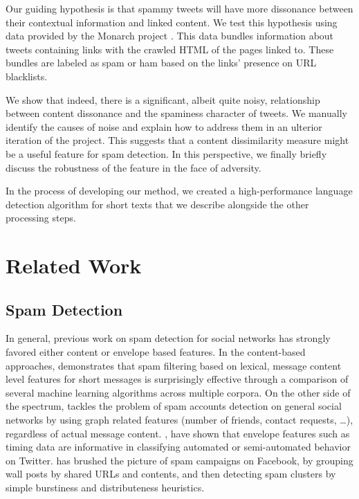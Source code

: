 \documentclass[times, 11pt, twocolumn]{article}
\begin{document}
Our guiding hypothesis is that spammy tweets will have more dissonance between their 
contextual information and linked content. We test this hypothesis using data provided by the 
Monarch project \cite{Thomas2011}. This data bundles information about tweets containing 
links with the crawled HTML of the pages linked to. These bundles are labeled as spam or 
ham based on the links' presence on URL blacklists.

We show that indeed, there is a significant, albeit quite noisy, relationship between content
dissonance and the spaminess character of tweets. We manually identify the causes of noise 
and explain how to address them in an ulterior iteration of the project. This suggests that
a content dissimilarity measure might be a useful feature for spam detection. In this perspective,
we finally briefly discuss the robustness of the feature in the face of adversity.

In the process of developing our method, we created a high-performance language detection 
algorithm for short texts that we describe alongside the other processing steps.

\section{Related Work}
\subsection{Spam Detection}
In general, previous work on spam detection for social networks has strongly favored 
either content or envelope based features. In the content-based approaches, \cite{Cormack2007} 
demonstrates that spam filtering based on lexical, message content level features 
for short messages is surprisingly effective through a comparison of several machine 
learning algorithms across multiple corpora. On the other side of the spectrum, \cite{Stringhini2010} 
tackles the problem of spam accounts detection on general social networks by using graph 
related features (number of friends, contact requests, \dots), regardless of actual 
message content. \cite{Zhang2011}, \cite{Ghosh2011} have shown that envelope features 
such as timing data are informative in classifying automated or semi-automated behavior 
on Twitter. \cite{Gao2010} has brushed the picture of spam campaigns on Facebook, by grouping 
wall posts by shared URLs and contents, and then detecting spam clusters by simple 
burstiness and distributeness heuristics.
\end{document}
